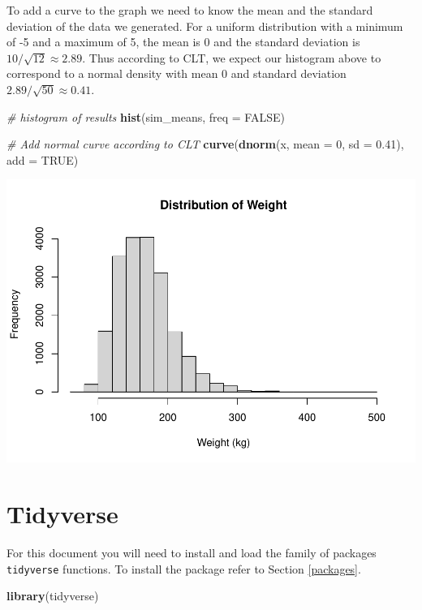 \documentclass[
]{book}
\newenvironment{Shaded}{\begin{snugshade}}{\end{snugshade}}
\newcommand{\CommentTok}[1]{\textcolor[rgb]{0.56,0.35,0.01}{\textit{#1}}}
\newcommand{\DataTypeTok}[1]{\textcolor[rgb]{0.13,0.29,0.53}{#1}}
\newcommand{\DecValTok}[1]{\textcolor[rgb]{0.00,0.00,0.81}{#1}}
\newcommand{\FloatTok}[1]{\textcolor[rgb]{0.00,0.00,0.81}{#1}}
\newcommand{\KeywordTok}[1]{\textcolor[rgb]{0.13,0.29,0.53}{\textbf{#1}}}
\newcommand{\NormalTok}[1]{#1}
\newcommand{\OtherTok}[1]{\textcolor[rgb]{0.56,0.35,0.01}{#1}}
\begin{document}
To add a curve to the graph we need to know the mean and the standard deviation of the data we generated. For a uniform distribution with a minimum of -5 and a maximum of 5, the mean is 0 and the standard deviation is \(10/\sqrt{12} \approx 2.89\). Thus according to CLT, we expect our histogram above to correspond to a normal density with mean 0 and standard deviation \(2.89/\sqrt{50} \approx 0.41\).

\begin{Shaded}
\begin{Highlighting}[]
\CommentTok{# histogram of results}
\KeywordTok{hist}\NormalTok{(sim_means, }\DataTypeTok{freq =} \OtherTok{FALSE}\NormalTok{)}

\CommentTok{# Add normal curve according to CLT}
\KeywordTok{curve}\NormalTok{(}\KeywordTok{dnorm}\NormalTok{(x, }\DataTypeTok{mean =} \DecValTok{0}\NormalTok{, }\DataTypeTok{sd =} \FloatTok{0.41}\NormalTok{), }\DataTypeTok{add =} \OtherTok{TRUE}\NormalTok{)}
\end{Highlighting}
\end{Shaded}

\includegraphics{_main_files/figure-latex/unnamed-chunk-229-1.pdf}

\hypertarget{tidyverse}{%
\chapter{Tidyverse}\label{tidyverse}}

For this document you will need to install and load the family of packages \texttt{tidyverse} functions. To install the package refer to Section \ref{packages}.

\begin{Shaded}
\begin{Highlighting}[]
\KeywordTok{library}\NormalTok{(tidyverse)}
\end{Highlighting}
\end{Shaded}
\end{document}
